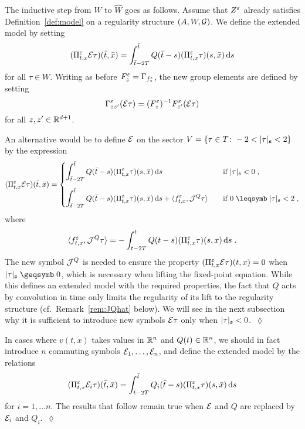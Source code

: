 \documentclass[reqno,11pt]{article}
\def\fraks{\mathfrak{s}}
\def\abss#1{\abs{#1}_\mathfrak{s}}
\begin{document}
The inductive step from $W$ to $\widehat{W}$ goes as follows. Assume that
$Z^\varepsilon$ already satisfies Definition~\ref{def:model} on a regularity structure
$(A,W,{\mathcal G})$. We define the extended model by setting  
\begin{equation}
\label{eq:E01} 
 (\Pi^\eps_{t,x}\cE\tau)(\bar t,\bar x) = 
  \int_{\bar t-2T}^{\bar t} Q(\bar t-s) (\Pi^\eps_{t,x}\tau)(s,\bar x)\6s
\end{equation} 
for all $\tau\in W$. 
Writing as before $F^\varepsilon_z = \Gamma_{f^\varepsilon_z}$, the new group elements are
defined by setting
\begin{equation}
 \label{eq:E03}
 \Gamma^\eps_{zz'}(\cE\tau) = (F^\eps_z)^{-1} F^\eps_{z'}(\cE\tau)
\end{equation} 
for all $z,z'\in\mathbb{R}^{d+1}$.

\begin{remark}
\label{rem:JQ} 
An alternative would be to define ${\mathcal E}$ on the sector $V = \setsuch{\tau\in
T}{-2<\abss{\tau}<2}$ by the expression
\begin{equation}
\label{eq:E01a} 
 (\Pi^\eps_{t,x}\cE\tau)(\bar t,\bar x) = 
 \begin{cases}
 \displaystyle\vrule height 5pt depth 18pt width 0pt
  \int_{\bar t-2T}^{\bar t} Q(\bar t-s) (\Pi^\eps_{t,x}\tau)(s,\bar x)\6s 
  &\text{if $\abss{\tau}<0$\;,} \\
  \displaystyle\vrule height 18pt depth 5pt width 0pt
  \int_{\bar t-2T}^{\bar t} Q(\bar t-s) (\Pi^\eps_{t,x}\tau)(s,\bar x)\6s
  + \pscal{f^\eps_{t,x}}{\cJ^Q\tau}\quad
  &\text{if $0\leqs\abss{\tau}<2$\;,}
 \end{cases}
\end{equation} 
where 
\begin{equation}
\label{eq:E02a} 
 \pscal{f^\eps_{t,x}}{\cJ^Q\tau} = 
 - \int_{t-2T}^t Q(t-s) (\Pi^\eps_{t,x}\tau)(s,x)\6s\;.
\end{equation} 
The new symbol ${\mathcal J}^Q$ is needed to ensure the property
$(\Pi^\varepsilon_{t,x}{\mathcal E}\tau)(t,x) = 0$ when $\abs{\tau}_\fraks\geqs0$, which is
necessary when lifting the fixed-point equation. 
While this defines an extended model with the required properties, the fact
that $Q$ acts by convolution in time only limits the regularity of its lift to
the regularity structure (cf.\ Remark~\ref{rem:JQhat} below). We will see in the
next subsection why it is sufficient to introduce new symbols ${\mathcal E}\tau$ only
when $\abs{\tau}_\fraks < 0$.~$\lozenge$ 
\end{remark}


\begin{remark}
\label{rem:E_vectorial} 
In cases where $v(t,x)$ takes values in $\mathbb{R}^n$ and $Q(t)\in\mathbb{R}^n$, we should 
in fact introduce $n$ commuting symbols ${\mathcal E}_1,\dots,{\mathcal E}_n$, and define the
extended model by the relations 
\begin{equation}
\label{eq:E04a} 
 (\Pi^\eps_{t,x}\cE_i\tau)(\bar t,\bar x) = 
  \int_{\bar t-2T}^{\bar t} Q_i(\bar t-s) (\Pi^\eps_{t,x}\tau)(s,\bar x)\6s 
\end{equation} 
for $i=1,\dots n$. The results that follow remain true when ${\mathcal E}$ and $Q$ are
replaced by ${\mathcal E}_i$ and $Q_i$.~$\lozenge$ 
\end{remark}
\end{document}
